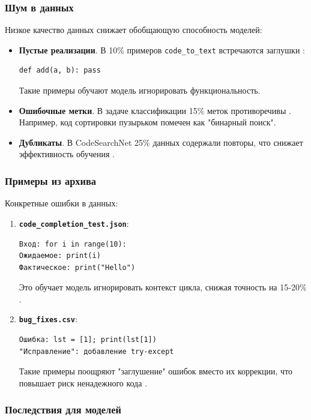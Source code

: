 \documentclass[14pt]{article}
\theoremstyle{definition}
\begin{document}
\subsubsection{Шум в данных}

Низкое качество данных снижает обобщающую способность моделей:
\begin{itemize}
    \item \textbf{Пустые реализации}. В 10\% примеров \texttt{code\_to\_text} встречаются заглушки \cite{karampatsis2020big}:
    \begin{verbatim}
def add(a, b): pass
    \end{verbatim}
    Такие примеры обучают модель игнорировать функциональность.
    \item \textbf{Ошибочные метки}. В задаче классификации 15\% меток противоречивы \cite{chen2023}. Например, код сортировки пузырьком помечен как "бинарный поиск".
    \item \textbf{Дубликаты}. В CodeSearchNet \cite{husain2019codesearchnet} 25\% данных содержали повторы, что снижает эффективность обучения \cite{liu2022survey}.
\end{itemize}

\subsubsection{Примеры из архива}

Конкретные ошибки в данных:
\begin{enumerate}
    \item \textbf{\texttt{code\_completion\_test.json}}: 
    \begin{verbatim}
Вход: for i in range(10):
Ожидаемое: print(i) 
Фактическое: print("Hello")
    \end{verbatim}
    Это обучает модель игнорировать контекст цикла, снижая точность на 15-20\% \cite{alon2019code2seq}.
    \item \textbf{\texttt{bug\_fixes.csv}}:
    \begin{verbatim}
Ошибка: lst = [1]; print(lst[1])
"Исправление": добавление try-except
    \end{verbatim}
    Такие примеры поощряют "заглушение" ошибок вместо их коррекции, что повышает риск ненадежного кода \cite{zhou2022devign}.
\end{enumerate}

\subsubsection{Последствия для моделей}
\end{document}
